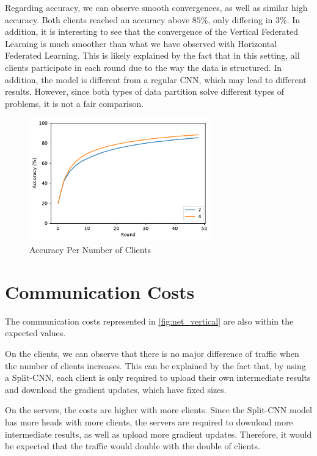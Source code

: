 Regarding accuracy, we can observe smooth convergences, as well as similar high accuracy. Both clients reached an accuracy above $85\%$, only differing in $3\%$. In addition, it is interesting to see that the convergence of the Vertical Federated Learning is much smoother than what we have observed with Horizontal Federated Learning. This is likely explained by the fact that in this setting, all clients participate in each round due to the way the data is structured. In addition, the model is different from a regular CNN, which may lead to different results. However, since both types of data partition solve different types of problems, it is not a fair comparison.

\begin{figure}[!ht]
    \centering
    \centering
    \includegraphics[width=0.7\textwidth]{graphics/vertical/accuracy.pdf}
    \caption{Accuracy Per Number of Clients}
    \label{fig:accuracy_vertical}
\end{figure}

\section{Communication Costs}

The communication costs represented in \autoref{fig:net_vertical} are also within the expected values.

On the clients, we can observe that there is no major difference of traffic when the number of clients increases. This can be explained by the fact that, by using a Split-CNN, each client is only required to upload their own intermediate results and download the gradient updates, which have fixed sizes.

On the servers, the costs are higher with more clients. Since the Split-CNN model has more heads with more clients, the servers are required to download more intermediate results, as well as upload more gradient updates. Therefore, it would be expected that the traffic would double with the double of clients.


